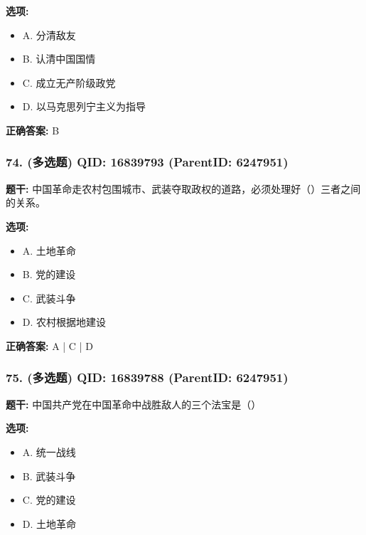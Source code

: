 \documentclass[12pt,UTF8]{ctexart}
\begin{document}
\textbf{选项:}
\begin{itemize}[leftmargin=*]

  \item A. 分清敌友

  \item B. 认清中国国情

  \item C. 成立无产阶级政党

  \item D. 以马克思列宁主义为指导

\end{itemize}

\textbf{正确答案:}
B

\vspace{0.3em}\hrulefill\vspace{0.7em}

\subsubsection*{74. (多选题) \small QID: 16839793 (ParentID: 6247951)}

\textbf{题干:}
中国革命走农村包围城市、武装夺取政权的道路，必须处理好（）三者之间的关系。



\textbf{选项:}
\begin{itemize}[leftmargin=*]

  \item A. 土地革命

  \item B. 党的建设

  \item C. 武装斗争

  \item D. 农村根据地建设

\end{itemize}

\textbf{正确答案:}
A | C | D

\vspace{0.3em}\hrulefill\vspace{0.7em}

\subsubsection*{75. (多选题) \small QID: 16839788 (ParentID: 6247951)}

\textbf{题干:}
中国共产党在中国革命中战胜敌人的三个法宝是（）



\textbf{选项:}
\begin{itemize}[leftmargin=*]

  \item A. 统一战线

  \item B. 武装斗争

  \item C. 党的建设

  \item D. 土地革命

\end{itemize}
\end{document}
